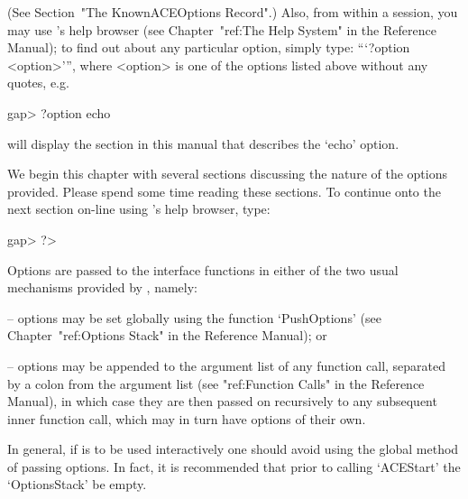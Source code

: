 (See Section~"The KnownACEOptions Record".) Also, from within a {\GAP}
session, you may use {\GAP}'s help browser (see Chapter~"ref:The  Help
System" in the  {\GAP}  Reference  Manual);  to  find  out  about  any
particular {\ACE} option, simply type: ```?option  <option>''',  where
<option> is one of the options listed above without any quotes, e.g.

\begintt
gap> ?option echo
\endtt

will display the section in this  manual  that  describes  the  `echo'
option.

We begin this chapter with several sections discussing the  nature  of
the options provided. Please spend some time reading  these  sections.
To continue onto the next section on-line using {\GAP}'s help browser,
type:

\begintt
gap> ?>
\endtt


Options are passed to the {\ACE} interface functions in either of the
two usual mechanisms provided by {\GAP}, namely:

\beginlist%

\item{--} options may be set globally using the function `PushOptions'
(see Chapter~"ref:Options Stack" in the {\GAP} Reference  Manual); or

\item{--} options may be appended to the argument list of any function
call, separated by a colon from the argument list  (see  "ref:Function
Calls" in the {\GAP} Reference Manual), in which case  they  are  then
passed on recursively to any subsequent inner function call, which may
in turn have options of their own.

\endlist

In general, if {\ACE} is to be used  interactively  one  should  avoid
using the global method of passing options. In fact, it is recommended
that prior to calling `ACEStart' the `OptionsStack' be empty.


